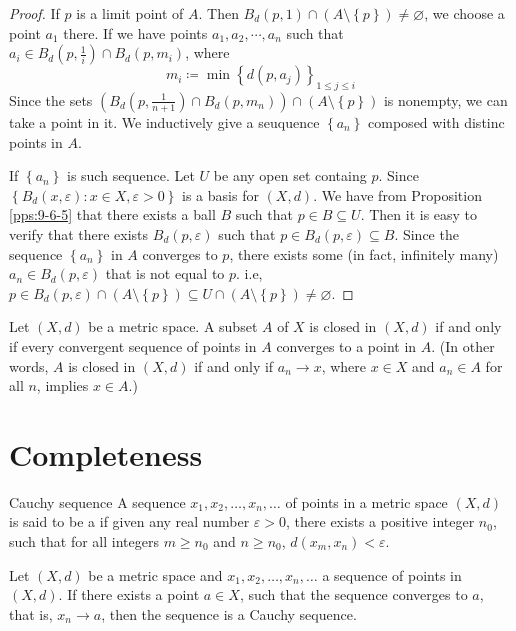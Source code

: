 \documentclass[../main.tex]{subfiles}
\begin{document}
\begin{proof}
    If \(  p  \) is a limit point of \(  A  \). Then \(  B_{d}\left( p,1 \right)\cap \left( A\setminus \left\{ p \right\} \right)\neq \varnothing    \), we choose a point \(  a_1  \) there. If we have points \(  a_1,a_2,\cdots ,a_{n}  \) such that  \(  a_{i}\in B_{d}\left( p,\frac{1 }{i }  \right)\cap B_{d}\left( p, m_{i} \right)    \), where \[
    m_{i}\coloneqq \min \left\{ d\left( p, a_{j} \right)  \right\}_{1\le j\le i}
    \]   Since the sets \(  \left( B_{d}\left( p,\frac{1 }{n+ 1 }  \right)\cap B_{d}\left( p, m_{n} \right)   \right)\cap \left( A\setminus \left\{ p \right\} \right)    \) is nonempty, we can take a point in it.  We inductively give a seuquence \(  \left\{ a_{n} \right\}  \) composed with distinc points in \(  A  \).
    
    If \(  \left\{ a_{n} \right\}  \) is such sequence. Let  \(  U  \) be any open set containg \(  p  \). Since \(  \left\{ B_{d}\left( x,  \varepsilon  \right): x \in X,  \varepsilon > 0  \right\}  \) is a basis for \(  \left( X,d \right)   \). We have from  Proposition \ref{pps:9-6-5} that there exists a ball \(  B  \) such that \(  p \in B\subseteq U  \). Then it is easy to verify that there exists \(  B_{d}\left( p, \varepsilon  \right)   \) such that \(   p \in B_{d}\left( p, \varepsilon  \right)\subseteq B   \). Since the sequence  \(  \left\{ a_{n} \right\}  \) in \(  A  \)  converges to \(  p  \), there      exists some (in fact, infinitely many)  \(  a_{n} \in B_{d}\left( p, \varepsilon  \right)   \) that is not equal to \(  p  \).  i.e, \(  p \in B_{d}\left( p, \varepsilon  \right)\cap \left( A\setminus \left\{ p \right\} \right)\subseteq U\cap \left( A\setminus \left\{ p \right\} \right)    \neq \varnothing \). 
\end{proof}

\begin{proposition}{}{}
Let $(X, d)$ be a metric space. A subset $A$ of $X$ is closed in $(X, d)$ if and only if every convergent sequence of points in $A$ converges to a point in $A$. (In other words, $A$ is closed in $(X, d)$ if and only if $a_n \to x$, where $x \in X$ and $a_n \in A$ for all $n$, implies $x \in A$.)
\end{proposition}

\section{Completeness}

\begin{definition}{Cauchy sequence}{}
A sequence $x_1, x_2, \dots, x_n, \dots$ of points in a metric space $(X, d)$ is said to be a  if given any real number $\varepsilon > 0$, there exists a positive integer $n_0$, such that for all integers $m \ge n_0$ and $n \ge n_0$, $d(x_m, x_n) < \varepsilon$.
\end{definition}
\begin{proposition}{}{}
Let $(X,d)$ be a metric space and $x_1,x_2,\dots,x_n,\dots$ a sequence of points in $(X,d)$. If there exists a point $a \in X$, such that the sequence converges to $a$, that is, $x_n \to a$, then the sequence is a Cauchy sequence.
\end{proposition}
\end{document}
